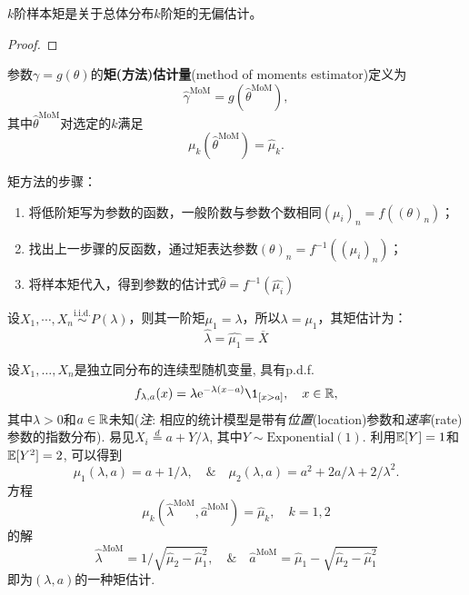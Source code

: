 \begin{proposition}
    $k$阶样本矩是关于总体分布$k$阶矩的无偏估计。
\end{proposition}
\begin{proof}

\end{proof}

\begin{definition}
    参数$\gamma = g(\theta)$的\textbf{矩{\color{lightgray}(方法)}估计量}(method of moments estimator)定义为
    \[ \hat{\gamma}^{\mathrm{MoM}} = g(\hat{\theta}^{\mathrm{MoM}}) , \]
    其中$\hat{\theta}^{\mathrm{MoM}}$对选定的$k$满足
    \[ \mu_{k}(\hat{\theta}^{\mathrm{MoM}}) = \hat{\mu}_{k} . \]
\end{definition}


矩方法的步骤：
\begin{enumerate}
    \item 将低阶矩写为参数的函数，一般阶数与参数个数相同$(\mu_i)_n=f((\theta)_n)$；
    \item 找出上一步骤的反函数，通过矩表达参数$(\theta)_n=f^{-1}((\mu_i)_n)$；
    \item 将样本矩代入，得到参数的估计式$\hat{\theta}=f^{-1}(\hat{\mu_i})$
\end{enumerate}

\begin{example}[泊松分布的矩估计]\label{moment_estimate_Poisson}
    设$X_1, \cdots ,X_n \overset{\text{i.i.d.}}{\sim} P(\lambda)$，则其一阶矩$\mu_1=\lambda$，所以$\lambda=\mu_1$，其矩估计为：
    \[ \hat{\lambda} = \hat{\mu_1} = \overline{X} \]
\end{example}

\begin{example}
    设$X_{1},\dots,X_{n}$是独立同分布的连续型随机变量, 具有p.d.f.
    \[ f_{\lambda,a}(x) = \lambda\mathrm{e}^{-\lambda(x-a)}\1_{[x>a]}, \quad x\in\R, \]
    其中$\lambda > 0$和$a \in \mathbb{R}$未知(\emph{注}: 相应的统计模型是带有\emph{位置}(location)参数和\emph{速率}(rate)参数的指数分布). 易见$X_{i} \stackrel{d}{=} a + Y/\lambda$, 其中$Y \sim \mathrm{Exponential}(1)$. 利用$\mathbb{E}[Y]=1$和$\mathbb{E}[Y^{2}] = 2$, 可以得到
    \[ \mu_{1}(\lambda,a) = a + 1/\lambda, \quad\&\quad
        \mu_{2}(\lambda,a) = a^{2} + 2a/\lambda + 2/\lambda^{2} . \]
    方程
    \[ \mu_{k}(\hat{\lambda}^{\mathrm{MoM}},\hat{a}^{\mathrm{MoM}}) = \hat{\mu}_{k}, \quad k = 1,2 \]
    的解
    \[ \hat{\lambda}^{\mathrm{MoM}} = 1\Big/\sqrt{\hat{\mu}_{2}-\hat{\mu}_{1}^{2}}, \quad\&\quad
        \hat{a}^{\mathrm{MoM}} = \hat{\mu}_{1}-\sqrt{\hat{\mu}_{2}-\hat{\mu}_{1}^{2}} \]
    即为$(\lambda,a)$的一种矩估计.
\end{example}

